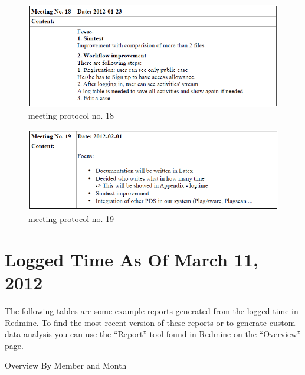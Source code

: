 \begin{appendix}
\begin{figure}[htbp]
  \centering
    \includegraphics[width=\textwidth]{images/a_meetings/meeting_18.png}
  \caption{meeting protocol no. 18}
  \label{fig:meeting protocol no. 18}
\end{figure}

\begin{figure}[htbp]
  \centering
    \includegraphics[width=\textwidth]{images/a_meetings/meeting_19.png}
  \caption{meeting protocol no. 19}
  \label{fig:meeting protocol no. 19}
\end{figure}



\chapter{Logged Time As Of March 11, 2012}

The following tables are some example reports generated from the logged time in Redmine. To find the most recent version
of these reports or to generate custom data analysis you can use the \enquote{Report} tool found in Redmine on the \enquote{Overview}
page.


\begin{table}[htbp]
  \caption{Overview By Member and Month}
  \centering
\end{table}


\end{appendix}
